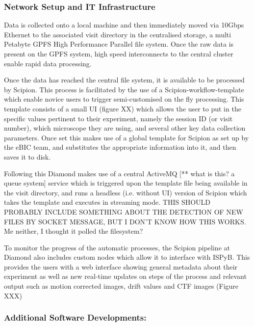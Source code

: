 \subsubsection{Network Setup and IT Infrastructure}

Data is collected onto a local machine %
and then immediately moved via 10Gbps Ethernet to the associated visit directory in the centralised storage, a multi Petabyte GPFS High Performance Parallel file system.  Once the raw data is present on the GPFS system, high speed interconnects to the central cluster enable rapid data processing. %

Once the data has reached the central file system, it is available to be processed by Scipion.  This process is facilitated by the use of a Scipion-workflow-template which enable novice users to trigger semi-customised on the fly processing. This template consists of a small UI (figure XX) which allows the user to put in the specific values pertinent to their experiment, namely the session ID (or visit number), which microscope they are using, and several other key data collection parameters.  Once set this makes use of a global template for Scipion as set up by the eBIC team, and substitutes the appropriate information into it, and then saves it to disk.




Following this Diamond makes use of a central ActiveMQ [** what is this? a queue system] service which is triggered upon the template file being available in the visit directory, and runs a headless (i.e. without UI) version of Scipion which takes the template and executes in streaming mode.  THIS SHOULD PROBABLY INCLUDE SOMETHING ABOUT THE DETECTION OF NEW FILES BY SOCKET MESSAGE, BUT I DON’T KNOW HOW THIS WORKS. Me neither, I thought it polled the filesystem?


To monitor the progress of the automatic processes, the Scipion pipeline at Diamond also includes custom nodes which allow it to interface with ISPyB.  This provides the users with a web interface showing general metadata about their experiment as well as new real-time updates on steps of the process and relevant output such as motion corrected images, drift values and CTF images (Figure XXX)

\subsubsection{Additional Software Developments: }

